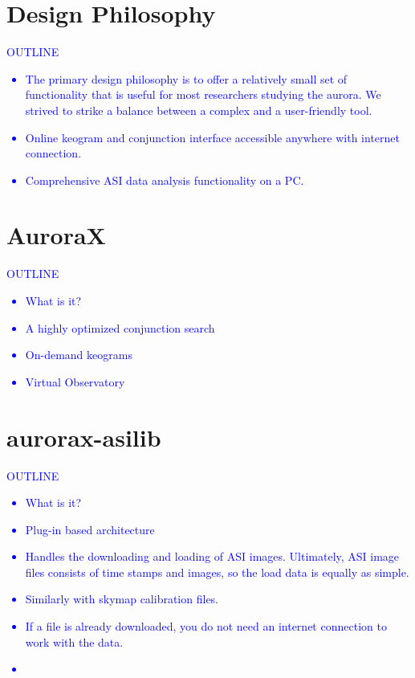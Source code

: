 \documentclass[draft]{agujournal2019}
\begin{document}
\section{Design Philosophy}
\textcolor{blue}{
      OUTLINE
      \begin{itemize}
            \item The primary design philosophy is to offer a relatively small set of functionality that is useful for most researchers studying the aurora. We strived to strike a balance between a complex and a user-friendly tool. 
            \item Online keogram and conjunction interface accessible anywhere with internet connection.
            \item Comprehensive ASI data analysis functionality on a PC.
      \end{itemize}
}

\section{AuroraX}\label{aurorax}
\textcolor{blue}{
      OUTLINE
      \begin{itemize}
            \item What is it?
            \item A highly optimized conjunction search
            \item On-demand keograms
            \item Virtual Observatory
      \end{itemize}
}

\section{aurorax-asilib}\label{aurorax-asilib}
\textcolor{blue}{
      OUTLINE
      \begin{itemize}
            \item What is it?
            \item Plug-in based architecture
            \item Handles the downloading and loading of ASI images. Ultimately, ASI image files consists of time stamps and images, so the load data is equally as simple.
            \item Similarly with skymap calibration files.
            \item If a file is already downloaded, you do not need an internet connection to work with the data.
            \item 
      \end{itemize}
}
\end{document}
